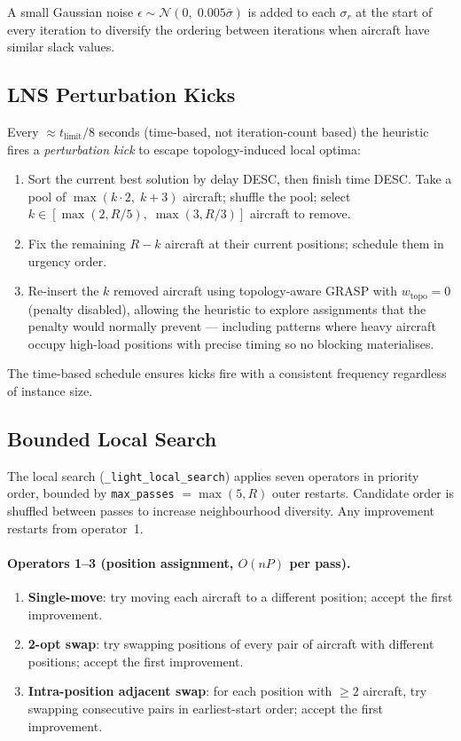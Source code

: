 A small Gaussian noise $\epsilon \sim \mathcal{N}(0,\; 0.005\bar{\sigma})$ is
added to each $\sigma_r$ at the start of every iteration to diversify the
ordering between iterations when aircraft have similar slack values.

\subsection{LNS Perturbation Kicks}

Every $\approx t_{\text{limit}}/8$ seconds (time-based, not iteration-count
based) the heuristic fires a \emph{perturbation kick} to escape topology-induced
local optima:

\begin{enumerate}[noitemsep]
    \item Sort the current best solution by delay DESC, then finish time DESC.
          Take a pool of $\max(k \cdot 2,\; k + 3)$ aircraft; shuffle the pool;
          select $k \in [\max(2, R/5),\; \max(3, R/3)]$ aircraft to remove.
    \item Fix the remaining $R - k$ aircraft at their current positions;
          schedule them in urgency order.
    \item Re-insert the $k$ removed aircraft using topology-aware GRASP with
          $w_{\text{topo}} = 0$ (penalty disabled), allowing the heuristic to
          explore assignments that the penalty would normally prevent — including
          patterns where heavy aircraft occupy high-load positions with precise
          timing so no blocking materialises.
\end{enumerate}

The time-based schedule ensures kicks fire with a consistent frequency
regardless of instance size.

\subsection{Bounded Local Search}

The local search (\texttt{\_light\_local\_search}) applies seven operators in
priority order, bounded by \texttt{max\_passes} $= \max(5, R)$ outer
restarts.  Candidate order is shuffled between passes to increase
neighbourhood diversity.  Any improvement restarts from operator~1.

\paragraph{Operators 1–3 (position assignment, $O(nP)$ per pass).}
\begin{enumerate}[noitemsep]
    \item \textbf{Single-move}: try moving each aircraft to a different
          position; accept the first improvement.
    \item \textbf{2-opt swap}: try swapping positions of every pair of
          aircraft with different positions; accept the first improvement.
    \item \textbf{Intra-position adjacent swap}: for each position with
          $\geq 2$ aircraft, try swapping consecutive pairs in earliest-start
          order; accept the first improvement.
\end{enumerate}

